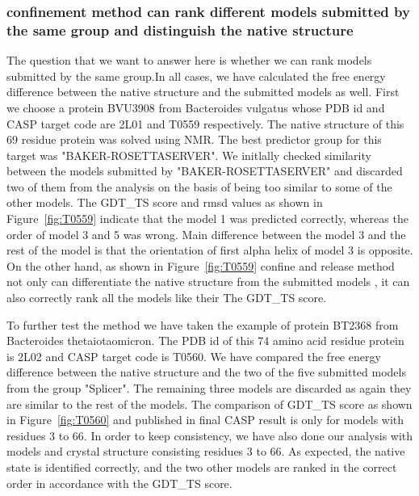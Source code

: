 \documentclass[12pt]{article}
\begin{document}
\subsubsection{confinement method can rank different models submitted by the same group and distinguish the native structure}

The question that we want to answer here is whether we can rank models submitted by the same group.In all cases, we have calculated the free energy
difference between the native structure and the submitted models as well. 
First we choose a protein BVU3908 from Bacteroides vulgatus whose PDB id and CASP target code are
2L01 and T0559 respectively. The native structure of this 69 residue protein was solved using NMR.
The best predictor group for this target was "BAKER-ROSETTASERVER".
We initlally checked similarity between the models submitted by "BAKER-ROSETTASERVER" and discarded two of them from the 
analysis on the basis of being too similar to some of the other models. The GDT\_TS score and rmsd
values as shown in Figure~\ref{fig:T0559} indicate that the model 1 was predicted correctly, 
whereas the order of model 3 and 5 was wrong. Main difference
between the model 3 and the rest of the model is that the orientation of first alpha helix of model 3 is opposite.
On the other hand, as shown in Figure~\ref{fig:T0559} confine and release method not only can differentiate the native 
structure from the submitted models , it can also correctly rank all the models like their The GDT\_TS score.  

To further test the method we have taken the example of protein BT2368 from Bacteroides thetaiotaomicron. The PDB id of this 
74 amino acid residue protein is 2L02 and CASP target code is T0560. We have compared the free energy difference between 
the native structure and the two of the five submitted models from the group "Splicer". The remaining three models are discarded as 
again they are similar to the rest of the models. The comparison of GDT\_TS score as shown in 
Figure~\ref{fig:T0560} and published in final CASP result is only for models with residues 3 to 66. In order to keep
consistency, we have also done our analysis with models and crystal structure consisting residues 3 to 66. As expected,
the native state is identified correctly, and the two other models are ranked in the correct order in accordance with the GDT\_TS score.   
\end{document}
